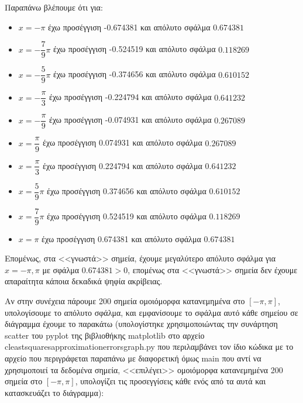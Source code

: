 \documentclass[a4paper,11pt]{article}
\newcommand{\lt}{\latintext}
\begin{document}
Παραπάνω βλέπουμε ότι για:\\
\begin{itemize}
    \item {\lt $x = -\pi$} έχω προσέγγιση -0.674381 και απόλυτο σφάλμα $0.674381$
    \item {\lt $x = -\dfrac{7}{9}\pi$} έχω προσέγγιση -0.524519 και απόλυτο σφάλμα $0.118269$
    \item {\lt $x = -\dfrac{5}{9}\pi$} έχω προσέγγιση -0.374656 και απόλυτο σφάλμα $0.610152$
    \item {\lt $x = -\dfrac{\pi}{3}$} έχω προσέγγιση -0.224794 και απόλυτο σφάλμα $0.641232$
    \item {\lt $x = -\dfrac{\pi}{9}$} έχω προσέγγιση -0.074931 και απόλυτο σφάλμα $0.267089$
    \item {\lt $x = \dfrac{\pi}{9}$} έχω προσέγγιση 0.074931 και απόλυτο σφάλμα $0.267089$
    \item {\lt $x = \dfrac{\pi}{3}$} έχω προσέγγιση 0.224794 και απόλυτο σφάλμα $0.641232$
    \item {\lt $x = \dfrac{5}{9}\pi$} έχω προσέγγιση 0.374656 και απόλυτο σφάλμα $0.610152$
    \item {\lt $x = \dfrac{7}{9}\pi$} έχω προσέγγιση 0.524519 και απόλυτο σφάλμα $0.118269$
    \item {\lt $x = \pi$} έχω προσέγγιση 0.674381 και απόλυτο σφάλμα $0.674381$
\end{itemize}

Επομένως, στα <<γνωστά>> σημεία, έχουμε μεγαλύτερο απόλυτο σφάλμα για {\lt $x = -\pi, \pi$} με σφάλμα $0.674381 > 0$, επομένως στα <<γνωστά>> σημεία δεν έχουμε απαραίτητα κάποια δεκαδικά ψηφία ακρίβειας.

\par
Αν στην συνέχεια πάρουμε 200 σημεία ομοιόμορφα κατανεμημένα στο $[-\pi, \pi]$, υπολογίσουμε το απόλυτο σφάλμα, και εμφανίσουμε το σφάλμα αυτό κάθε σημείου σε διάγραμμα έχουμε το παρακάτω (υπολογίστηκε χρησιμοποιώντας την συνάρτηση {\lt scatter} του {\lt pyplot} της βιβλιοθήκης {\lt matplotlib} στο αρχείο {\lt c\textunderscore least\textunderscore squares\textunderscore approximation\textunderscore errors\textunderscore graph.py} που περιλαμβάνει τον ίδιο κώδικα με το αρχείο που περιγράφεται παραπάνω με διαφορετική όμως {\lt main} που αντί να χρησιμοποιεί τα δεδομένα σημεία, <<επιλέγει>> ομοιόμορφα κατανεμημένα 200 σημεία στο $[-\pi, \pi]$, υπολογίζει τις προσεγγίσεις κάθε ενός από τα αυτά και κατασκευάζει το διάγραμμα):\\
\end{document}
